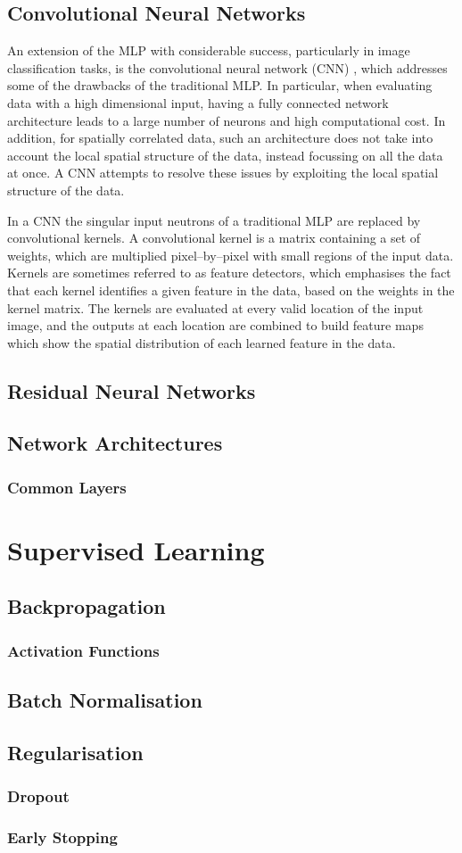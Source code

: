 \subsection{Convolutional Neural Networks}
An extension of the MLP with considerable success, particularly in image 
classification tasks, is the convolutional neural network (CNN) 
\cite{Jackel2008, Szegedy2015}, which addresses some of the drawbacks of the 
traditional MLP. In particular, when evaluating data with a high dimensional 
input, having a fully connected network architecture leads to a large number 
of neurons and high computational cost. In addition, for spatially correlated 
data, such an architecture does not take into account the local spatial 
structure of the data, instead focussing on all the data at once. A CNN 
attempts to resolve these issues by exploiting the local spatial structure of 
the data.

In a CNN the singular input neutrons of a traditional MLP are replaced by
convolutional kernels. A convolutional kernel is a matrix containing a set of 
weights, which are multiplied pixel--by--pixel with small regions of the input 
data. Kernels are sometimes referred to as feature detectors, which emphasises
the fact that each kernel identifies a given feature in the data, based on the
weights in the kernel matrix. The kernels are evaluated at every valid 
location of the input image, and the outputs at each location are combined to
build feature maps which show the spatial distribution of each learned feature
in the data. 

\subsection{Residual Neural Networks}
\subsection{Network Architectures}
\subsubsection*{Common Layers}


\section{Supervised Learning}
\subsection{Backpropagation}
\subsubsection{Activation Functions}
\subsection{Batch Normalisation}
\subsection{Regularisation}
\subsubsection*{Dropout}
\subsubsection*{Early Stopping}
